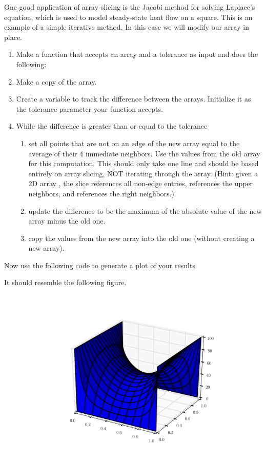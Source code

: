 \begin{problem} 
One good application of array slicing is the Jacobi
method for solving Laplace's equation, which is used to model
steady-state heat flow on a square. This is an example of a simple
iterative method. In this case we will modify our array in place. 
\begin{enumerate}
\item Make a function that accepts an array and a tolerance as input and does the
following: 
\item Make a copy of the array. 
\item Create a variable to track the difference between the arrays. Initialize
it as the tolerance parameter your function accepts. 
\item While the difference is greater than or equal
to the tolerance 
\begin{enumerate} 
\item set all points that are not on an edge of the new array equal to the average of their 4 immediate neighbors. Use the values from the old array for this computation. 
This should only take one line and should be based entirely on array slicing, NOT iterating through the array.
(Hint: given a 2D array , the slice  references
all non-edge entries,  references the upper neighbors,
and  references the right neighbors.) 
\item update the difference to be the maximum of the absolute value of the new array
minus the old one. 
\item copy the values from the new array into the old
one (without creating a new array). 
\end{enumerate} 
\end{enumerate}

Now use the following code to generate a plot of your results
 
It should resemble the following figure.

\begin{figure} [H]
\includegraphics[width=.75\textwidth]{laplace.pdf}
\end{figure} 
\end{problem}



